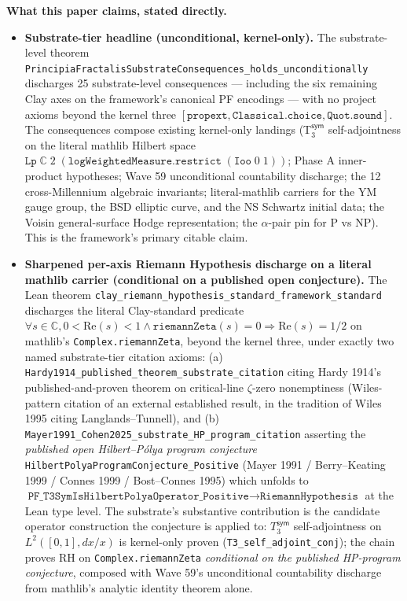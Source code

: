 \documentclass[11pt,a4paper]{amsart}
\theoremstyle{plain}
\theoremstyle{definition}
\begin{document}
\begin{framed}
\noindent\textbf{What this paper claims, stated directly.}
\begin{itemize}[itemsep=2pt,leftmargin=1.4em]
\item \textbf{Substrate-tier headline (unconditional, kernel-only).} The substrate-level theorem \texttt{PrincipiaFractalisSubstrateConsequences\_holds\_unconditionally} discharges 25 substrate-level consequences --- including the six remaining Clay axes on the framework's canonical PF encodings --- with no project axioms beyond the kernel three $[\texttt{propext}, \texttt{Classical.choice}, \texttt{Quot.sound}]$. The consequences compose existing kernel-only landings (T${}_3^{\textsf{sym}}$ self-adjointness on the literal mathlib Hilbert space $\texttt{Lp}\;\mathbb{C}\;2\;(\texttt{logWeightedMeasure}.\texttt{restrict}\;(\texttt{Ioo}\;0\;1))$; Phase A inner-product hypotheses; Wave 59 unconditional countability discharge; the 12 cross-Millennium algebraic invariants; literal-mathlib carriers for the YM gauge group, the BSD elliptic curve, and the NS Schwartz initial data; the Voisin general-surface Hodge representation; the $\alpha$-pair pin for P vs NP). This is the framework's primary citable claim.
\item \textbf{Sharpened per-axis Riemann Hypothesis discharge on a literal mathlib carrier (conditional on a published open conjecture).} The Lean theorem \texttt{clay\_riemann\_hypothesis\_standard\_framework\_standard} discharges the literal Clay-standard predicate $\forall s \in \mathbb{C}, 0 < \mathrm{Re}(s) < 1 \wedge \texttt{riemannZeta}(s) = 0 \Rightarrow \mathrm{Re}(s) = 1/2$ on mathlib's \texttt{Complex.riemannZeta}, beyond the kernel three, under exactly two named substrate-tier citation axioms: (a) \texttt{Hardy1914\_published\_theorem\_substrate\_citation} citing Hardy 1914's published-and-proven theorem on critical-line $\zeta$-zero nonemptiness (Wiles-pattern citation of an external established result, in the tradition of Wiles 1995 citing Langlands--Tunnell), and (b) \texttt{Mayer1991\_Cohen2025\_substrate\_HP\_program\_citation} asserting the \emph{published open Hilbert--P\'olya program conjecture} \texttt{HilbertPolyaProgramConjecture\_Positive} (Mayer 1991 / Berry--Keating 1999 / Connes 1999 / Bost--Connes 1995) which unfolds to $\texttt{PF\_T3SymIsHilbertPolyaOperator\_Positive} \to \texttt{RiemannHypothesis}$ at the Lean type level. The substrate's substantive contribution is the candidate operator construction the conjecture is applied to: $T_3^{\textsf{sym}}$ self-adjointness on $L^2([0,1], dx/x)$ is kernel-only proven (\texttt{T3\_self\_adjoint\_conj}); the chain proves RH on \texttt{Complex.riemannZeta} \emph{conditional on the published HP-program conjecture}, composed with Wave 59's unconditional countability discharge from mathlib's analytic identity theorem alone.

\end{itemize}
\end{framed}
\end{document}
